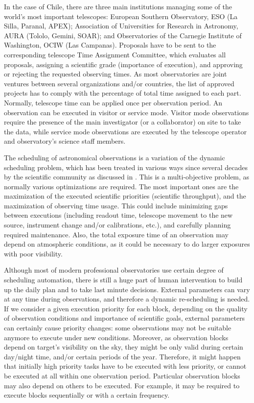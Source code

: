 \documentclass[11pt]{article}
\begin{document}
In the case of Chile, there are three main institutions managing some of the world’s most important telescopes: European Southern Observatory, ESO (La Silla, Paranal, APEX); Association of Universities for Research in Astronomy, AURA (Tololo, Gemini, SOAR); and Observatories of the Carnegie Institute of Washington, OCIW (Las Campanas). Proposals have to be sent to the corresponding telescope Time Assignment Committee, which evaluates all proposals, assigning a scientific grade (importance of execution), and approving or rejecting the requested observing times. As most observatories are joint ventures between several organizations and/or countries, the list of approved projects has to comply with the percentage of total time assigned to each part. Normally, telescope time can be applied once per observation period. An observation can be executed in visitor or service mode. Visitor mode observations require the presence of the main investigator (or a collaborator) on site to take the data, while service mode observations are executed by the telescope operator and observatory’s science staff members.

The scheduling of astronomical observations is a variation of the dynamic scheduling problem, which has been treated in various ways since several decades by the scientific community as discussed in \cite{gomez03}. This is a multi-objective problem, as normally various optimizations are required. The most important ones are the maximization of the executed scientific priorities (scientific throughput), and the maximization of observing time usage. This could include minimizing gaps between executions (including readout time, telescope movement to the new source, instrument change and/or calibrations, etc.), and carefully planning required maintenance. Also, the total exposure time of an observation may depend on atmospheric conditions, as it could be necessary to do larger exposures with poor visibility.

Although most of modern professional observatories use certain degree of scheduling automation, there is still a huge part of human intervention to build up the daily plan and to take last minute decisions. External parameters can vary at any time during observations, and therefore a dynamic re-scheduling is needed. If we consider a given execution priority for each block, depending on the quality of observation conditions and importance of scientific goals, external parameters can certainly cause priority changes: some observations may not be suitable anymore to execute under new conditions. Moreover, as observation blocks depend on target’s visibility on the sky, they might be only valid during certain day/night time, and/or certain periods of the year. Therefore, it might happen that initially high priority tasks have to be executed with less priority, or cannot be executed at all within one observation period. Particular observation blocks may also depend on others to be executed. For example, it may be required to execute blocks sequentially or with a certain frequency.
\end{document}
